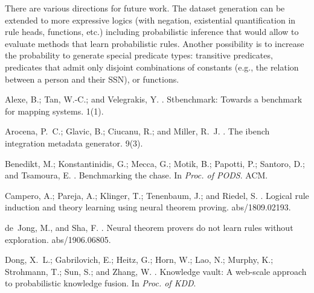 \documentclass[letterpaper]{article} \usepackage{aaai20}  \usepackage{times}  \usepackage{helvet} \usepackage{courier}  \usepackage[hyphens]{url}  \usepackage{graphicx} \urlstyle{rm} \def\UrlFont{\rm}  \usepackage{graphicx}  \frenchspacing  \setlength{\pdfpagewidth}{8.5in}  \setlength{\pdfpageheight}{11in}  \usepackage{amsthm}
\theoremstyle{definition}
\begin{document}
There are various directions for future work. 
The dataset generation can be extended to more expressive logics
(with negation, existential quantification in rule heads, functions, etc.) including probabilistic inference that would allow to evaluate methods that learn probabilistic rules. Another possibility is to increase the probability to generate special predicate types: transitive predicates, predicates that admit only disjoint combinations of constants (e.g., the relation between a person and their SSN), or functions. 



\begin{thebibliography}{}

Alexe, B.; Tan, W.-C.; and Velegrakis, Y.
.
\newblock Stbenchmark: Towards a benchmark for mapping systems.
 1(1).

Arocena, P.~C.; Glavic, B.; Ciucanu, R.; and Miller, R.~J.
.
\newblock The ibench integration metadata generator.
 9(3).

Benedikt, M.; Konstantinidis, G.; Mecca, G.; Motik, B.; Papotti, P.; Santoro,
  D.; and Tsamoura, E.
.
\newblock Benchmarking the chase.
\newblock In {\em Proc. of PODS}.
\newblock ACM.

Campero, A.; Pareja, A.; Klinger, T.; Tenenbaum, J.; and Riedel, S.
.
\newblock Logical rule induction and theory learning using neural theorem
  proving.
 abs/1809.02193.

de~Jong, M., and Sha, F.
.
\newblock Neural theorem provers do not learn rules without exploration.
 abs/1906.06805.

Dong, X.~L.; Gabrilovich, E.; Heitz, G.; Horn, W.; Lao, N.; Murphy, K.;
  Strohmann, T.; Sun, S.; and Zhang, W.
.
\newblock Knowledge vault: A web-scale approach to probabilistic knowledge
  fusion.
\newblock In {\em Proc. of KDD}.


\end{thebibliography}
\end{document}
